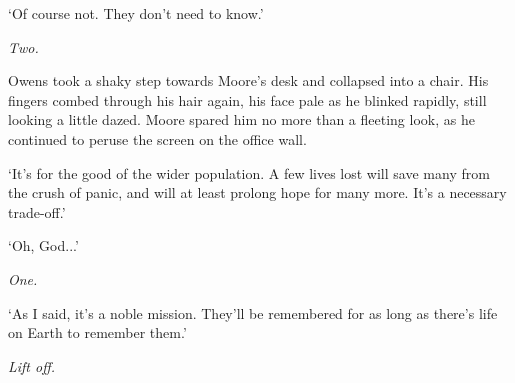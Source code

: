 `Of course not. They don't need to know.'

{\it Two.}

Owens took a shaky step towards Moore's desk and collapsed into a chair. His fingers combed through his hair again, his face pale as he blinked rapidly, still looking a little dazed. Moore spared him no more than a fleeting look, as he continued to peruse the screen on the office wall.

`It's for the good of the wider population. A few lives lost will save many from the crush of panic, and will at least prolong hope for many more. It's a necessary trade-off.'

`Oh, God...'

{\it One.}

`As I said, it's a noble mission. They'll be remembered for as long as there's life on Earth to remember them.'

{\it Lift off.}